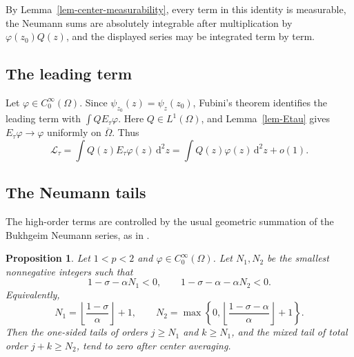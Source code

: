 \documentclass[a4paper,11pt]{article}
\newcommand{\dd}{\,\text{d}}
\theoremstyle{plain}
\newtheorem{prop}[thm]{Proposition}
\theoremstyle{definition}
\theoremstyle{remark}
\begin{document}
By Lemma~\ref{lem-center-measurability}, every term in this identity is measurable, the Neumann sums are absolutely integrable after multiplication by $\varphi(z_0)Q(z)$, and the displayed series may be integrated term by term.

\subsection{The leading term}

Let $\varphi\in C_0^\infty(\Omega)$. Since $\psi_{z_0}(z)=\psi_z(z_0)$, Fubini's theorem identifies the leading term with $\int Q E_\tau\varphi$. Here $Q\in L^1(\Omega)$, and Lemma~\ref{lem-Etau} gives $E_\tau\varphi\to\varphi$ uniformly on $\overline\Omega$. Thus
\begin{equation}\label{leading-limit}
 \mathcal L_\tau
 =\int Q(z)E_\tau\varphi(z)\dd^2z
 =\int Q(z)\varphi(z)\dd^2z+o(1).
\end{equation}

\subsection{The Neumann tails}

The high-order terms are controlled by the usual geometric summation of the Bukhgeim Neumann series, as in \cite{BlastenTzouWang2020}.

\begin{prop}\label{prop-neumann-tails}
Let $1<p<2$ and $\varphi\in C_0^\infty(\Omega)$.  Let $N_1,N_2$ be the smallest nonnegative integers such that
\begin{equation}\label{tail-cutoff-inequalities}
 1-\sigma-\alpha N_1<0,
 \qquad
 1-\sigma-\alpha-\alpha N_2<0.
\end{equation}
Equivalently,
\begin{equation}\label{L-M-choice}
 N_1=\left\lfloor\frac{1-\sigma}{\alpha}\right\rfloor+1,
 \qquad
 N_2=\max\left\{0,
 \left\lfloor\frac{1-\sigma-\alpha}{\alpha}\right\rfloor+1
 \right\}.
\end{equation}
Then the one-sided tails of orders $j\geq N_1$ and $k\geq N_1$, and the mixed tail of total order $j+k\geq N_2$, tend to zero after center averaging.
\end{prop}
\end{document}
